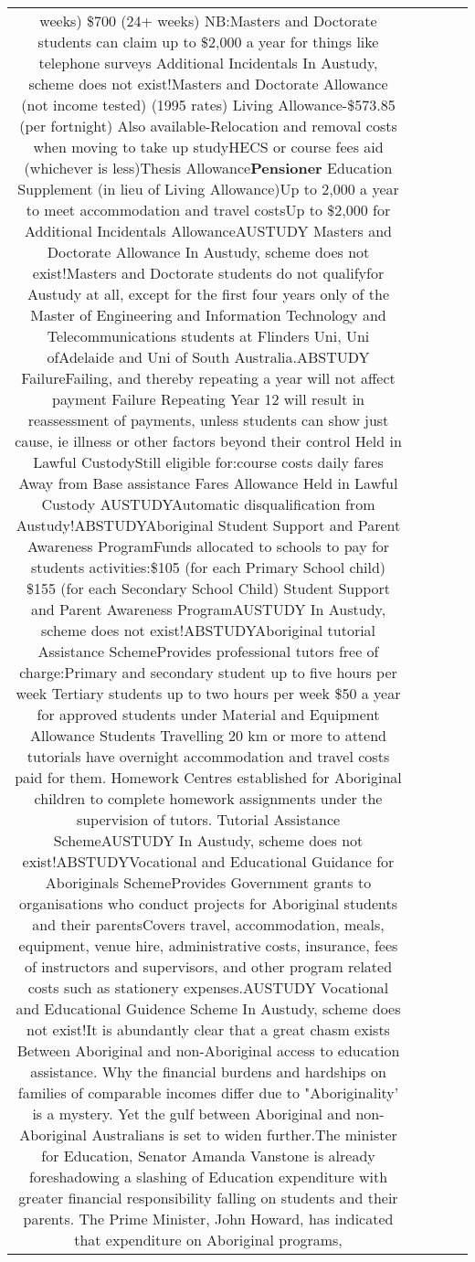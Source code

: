 \documentclass[11pt]{article}
\newlength\mylength
\begin{document}
\begin{center}
\begin{longtable}{|C{.65\mylength}|C{.30\mylength}|C{.12\mylength}|C{.12\mylength}|C{.12\mylength}|}
weeks) \$700 (24+ weeks) NB:Masters and Doctorate students can claim up to \$2,000 a year for things like telephone surveys Additional Incidentals In Austudy, scheme does not exist!Masters and Doctorate Allowance (not income tested) (1995 rates) Living Allowance-\$573.85 (per fortnight) Also available-Relocation and removal costs when moving to take up studyHECS or course fees aid (whichever is less)Thesis Allowance\textbf{Pensioner} Education Supplement (in lieu of Living Allowance)Up to 2,000 a year to meet accommodation and travel costsUp to \$2,000 for Additional Incidentals AllowanceAUSTUDY Masters and Doctorate Allowance In Austudy, scheme does not exist!Masters and Doctorate students do not qualifyfor Austudy at all, except for the first four years only of the Master of Engineering and Information Technology and Telecommunications students at Flinders Uni, Uni ofAdelaide and Uni of South Australia.ABSTUDY FailureFailing, and thereby repeating a year will not affect payment Failure Repeating Year 12 will result in reassessment of payments, unless students can show just cause, ie illness or other factors beyond their control Held in Lawful CustodyStill eligible for:course costs daily fares Away from Base assistance Fares Allowance Held in Lawful Custody AUSTUDYAutomatic disqualification from Austudy!ABSTUDYAboriginal Student Support and Parent Awareness ProgramFunds allocated to schools to pay for students activities:\$105 (for each Primary School child) \$155 (for each Secondary School Child) Student Support and Parent Awareness ProgramAUSTUDY In Austudy, scheme does not exist!ABSTUDYAboriginal tutorial Assistance SchemeProvides professional tutors free of charge:Primary and secondary student up to five hours per week Tertiary students up to two hours per week \$50 a year for approved students under Material and Equipment Allowance Students Travelling 20 km or more to attend tutorials have overnight accommodation and travel costs paid for them. Homework Centres established for Aboriginal children to complete homework assignments under the supervision of tutors. Tutorial Assistance SchemeAUSTUDY In Austudy, scheme does not exist!ABSTUDYVocational and Educational Guidance for Aboriginals SchemeProvides Government grants to organisations who conduct projects for Aboriginal students and their parentsCovers travel, accommodation, meals, equipment, venue hire, administrative costs, insurance, fees of instructors and supervisors, and other program related costs such as stationery expenses.AUSTUDY Vocational and Educational Guidence Scheme In Austudy, scheme does not exist!It is abundantly clear that a great chasm exists Between Aboriginal and non-Aboriginal access to education assistance. Why the financial burdens and hardships on families of comparable incomes differ due to "Aboriginality' is a mystery. Yet the gulf between Aboriginal and non-Aboriginal Australians is set to widen further.The minister for Education, Senator Amanda Vanstone is already foreshadowing a slashing of Education expenditure with greater financial responsibility falling on students and their parents. The Prime Minister, John Howard, has indicated that expenditure on Aboriginal programs, 
\end{longtable}
\end{center}
\end{document}
